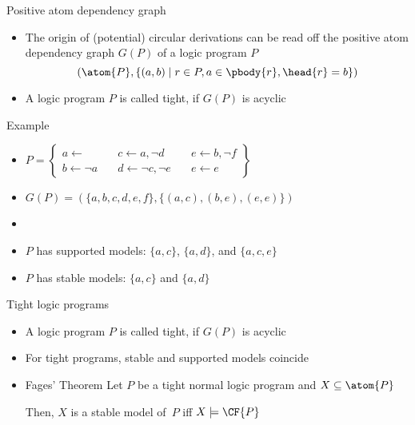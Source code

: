 \begin{frame}{Positive atom dependency graph}
  \bigskip
  \begin{itemize}
  \item<1->
    The origin of (potential) circular derivations can be read off the
    \alert{positive atom dependency graph} $G(P)$ of a logic program $P$
    \[
      (\atom{P}, \{(a,b) \mid r\in P, a \in \pbody{r}, \head{r}=b\})
    \]
    \smallskip
  \item<2-> A logic program $P$ is called \alert{tight}, if $G(P)$ is acyclic
  \end{itemize}
\end{frame}
\begin{frame}[c]{Example}
  \bigskip
  \begin{itemize}
  \item<1-> []
    \par\bigskip
    \(
    P
    =
    \left\{
      \begin{array}{lll}
        a \leftarrow                 \quad &
        c \leftarrow a, \neg d       \quad &
        e \leftarrow b, \neg f
        \\
        b \leftarrow \neg a         \quad &
        d \leftarrow \neg c, \neg e \quad &
        e \leftarrow e
      \end{array}
    \right\}
    \)
    \bigskip
    \bigskip
  \item<2->
    \(
    G(P)= (\{a,b,c,d,e,f\},\{(a,c),(b,e),(e,e)\})
    \)
  \item<3-> []
    \begin{center}
      
    \end{center}
  \item<4-> $P$ has supported models: $\{a,c\}$, $\{a,d\}$, and $\{a,c,e\}$
    \smallskip
  \item<4-> $P$ has stable    models: $\{a,c\}$ and $\{a,d\}$
  \end{itemize}
\end{frame}
\begin{frame}{Tight logic programs}
  \bigskip
  \begin{itemize}
  \item<1-> A logic program $P$ is called \alert{tight}, if $G(P)$ is acyclic
    \medskip
  \item<2-> For tight programs, stable and supported models coincide\pause[3]
    \bigskip
  \item<3->[] \par
    \begin{minipage}[t]{0.8\linewidth}
    \begin{block}{Fages' Theorem}
      Let $P$ be a tight normal logic program and $X\subseteq\atom{P}$
      \par\medskip
      Then, $X$ is a stable model of~$P$ iff $X\models\CF{P}$
    \end{block}
    \end{minipage}
  \end{itemize}
\end{frame}

